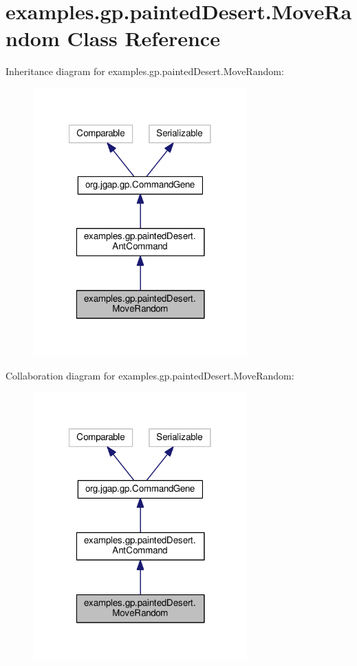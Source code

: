 \hypertarget{classexamples_1_1gp_1_1painted_desert_1_1_move_random}{\section{examples.\-gp.\-painted\-Desert.\-Move\-Random Class Reference}
\label{classexamples_1_1gp_1_1painted_desert_1_1_move_random}
}


Inheritance diagram for examples.\-gp.\-painted\-Desert.\-Move\-Random\-:
\nopagebreak
\begin{figure}[H]
\begin{center}
\leavevmode
\includegraphics[width=233pt]{classexamples_1_1gp_1_1painted_desert_1_1_move_random__inherit__graph}
\end{center}
\end{figure}


Collaboration diagram for examples.\-gp.\-painted\-Desert.\-Move\-Random\-:
\nopagebreak
\begin{figure}[H]
\begin{center}
\leavevmode
\includegraphics[width=233pt]{classexamples_1_1gp_1_1painted_desert_1_1_move_random__coll__graph}
\end{center}
\end{figure}
